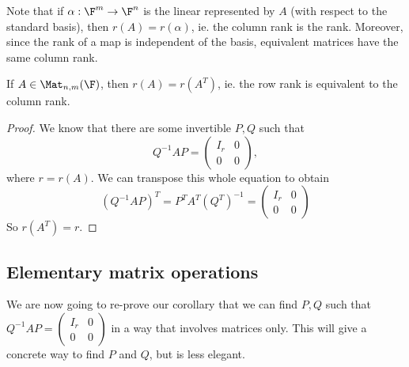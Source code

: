 \documentclass[a4paper]{article}
\begin{document}
Note that if $\alpha: \F^m \to \F^n$ is the linear represented by $A$ (with respect to the standard basis), then $r(A) = r(\alpha)$, ie. the column rank is the rank. Moreover, since the rank of a map is independent of the basis, equivalent matrices have the same column rank.

\begin{thm}[]
  If $A \in \Mat_{n, m}(\F)$, then $r(A) = r(A^T)$, ie. the row rank is equivalent to the column rank.
\end{thm}

\begin{proof}
  We know that there are some invertible $P, Q$ such that
  \[
    Q^{-1}AP =
    \begin{pmatrix}
      I_r & 0\\
      0 & 0
    \end{pmatrix},
  \]
  where $r = r(A)$. We can transpose this whole equation to obtain
  \[
    (Q^{-1}AP)^T = P^T A^T (Q^T)^{-1} =
    \begin{pmatrix}
      I_r & 0\\
      0 & 0
    \end{pmatrix}
  \]
  So $r(A^T) = r$.
\end{proof}

\subsection{Elementary matrix operations}
We are now going to re-prove our corollary that we can find $P, Q$ such that $Q^{-1}AP = \begin{pmatrix} I_r & 0\\ 0 & 0 \end{pmatrix}$ in a way that involves matrices only. This will give a concrete way to find $P$ and $Q$, but is less elegant.
\end{document}
